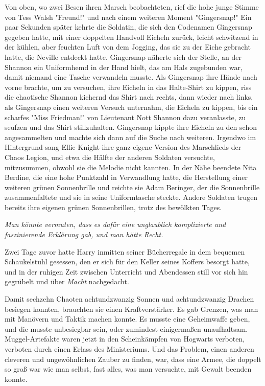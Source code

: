 {Von oben, wo zwei Besen ihren Marsch beobachteten, rief die hohe junge Stimme von Tess Walsh "Freund!" und nach einem weiteren Moment "Gingersnap!" Ein paar Sekunden später kehrte die Soldatin, die sich den Codenamen Gingersnap gegeben hatte, mit einer doppelten Handvoll Eicheln zurück, leicht schwitzend in der kühlen, aber feuchten Luft von dem Jogging, das sie zu der Eiche gebracht hatte, die Neville entdeckt hatte. Gingersnap näherte sich der Stelle, an der Shannon ein Uniformhemd in der Hand hielt, das am Hals zugebunden war, damit niemand eine Tasche verwandeln musste. Als Gingersnap ihre Hände nach vorne brachte, um zu versuchen, ihre Eicheln in das Halte-Shirt zu kippen, riss die chaotische Shannon kichernd das Shirt nach rechts, dann wieder nach links, als Gingersnap einen weiteren Versuch unternahm, die Eicheln zu kippen, bis ein scharfes "Miss Friedman!" von Lieutenant Nott Shannon dazu veranlasste, zu seufzen und das Shirt stillzuhalten. Gingersnap kippte ihre Eicheln zu den schon angesammelten und machte sich dann auf die Suche nach weiteren. Irgendwo im Hintergrund sang Ellie Knight ihre ganz eigene Version des Marschlieds der Chaos Legion, und etwa die Hälfte der anderen Soldaten versuchte, mitzusummen, obwohl sie die Melodie nicht kannten. In der Nähe beendete Nita Berdine, die eine hohe Punktzahl in Verwandlung hatte, die Herstellung einer weiteren grünen Sonnenbrille und reichte sie Adam Beringer, der die Sonnenbrille zusammenfaltete und sie in seine Uniformtasche steckte. Andere Soldaten trugen bereits ihre eigenen grünen Sonnenbrillen, trotz des bewölkten Tages.

\emph{Man könnte vermuten, dass es dafür eine unglaublich komplizierte und faszinierende Erklärung gab, und man hätte Recht.}

Zwei Tage zuvor hatte Harry inmitten seiner Bücherregale in dem bequemen Schaukelstuhl gesessen, den er sich für den Keller seines Koffers besorgt hatte, und in der ruhigen Zeit zwischen Unterricht und Abendessen still vor sich hin gegrübelt und über \emph{Macht} nachgedacht.

Damit sechzehn Chaoten achtundzwanzig Sonnen und achtundzwanzig Drachen besiegen konnten, brauchten sie einen Kraftverstärker. Es gab Grenzen, was man mit Manövern und Taktik machen konnte. Es musste eine Geheimwaffe geben, und die musste unbesiegbar sein, oder zumindest einigermaßen unaufhaltsam.\\ Muggel-Artefakte waren jetzt in den Scheinkämpfen von Hogwarts verboten, verboten durch einen Erlass des Ministeriums. Und das Problem, einen anderen cleveren und ungewöhnlichen Zauber zu finden, war, dass eine Armee, die doppelt so groß war wie man selbst, fast alles, was man versuchte, mit Gewalt beenden konnte.

}
